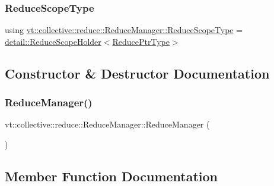 \subsubsection{\texorpdfstring{Reduce\+Scope\+Type}{ReduceScopeType}}
{\footnotesize\ttfamily using \hyperlink{structvt_1_1collective_1_1reduce_1_1_reduce_manager_a2c340e5d3b12e4f2df64b9c1502445cf}{vt\+::collective\+::reduce\+::\+Reduce\+Manager\+::\+Reduce\+Scope\+Type} =  \hyperlink{structvt_1_1collective_1_1reduce_1_1detail_1_1_reduce_scope_holder}{detail\+::\+Reduce\+Scope\+Holder}$<$\hyperlink{structvt_1_1collective_1_1reduce_1_1_reduce_manager_ae6d6635476f9d9f601d131a334ca3817}{Reduce\+Ptr\+Type}$>$}



\subsection{Constructor \& Destructor Documentation}
\mbox{\label{structvt_1_1collective_1_1reduce_1_1_reduce_manager_a28e777d1b70bc4e2d369db4ed3df76ab}} 
\subsubsection{\texorpdfstring{Reduce\+Manager()}{ReduceManager()}}
{\footnotesize\ttfamily vt\+::collective\+::reduce\+::\+Reduce\+Manager\+::\+Reduce\+Manager (\begin{DoxyParamCaption}{ }\end{DoxyParamCaption})}



\subsection{Member Function Documentation}
\mbox{\label{structvt_1_1collective_1_1reduce_1_1_reduce_manager_ad502c08497db1a1d811e1cad034f4891}} 
